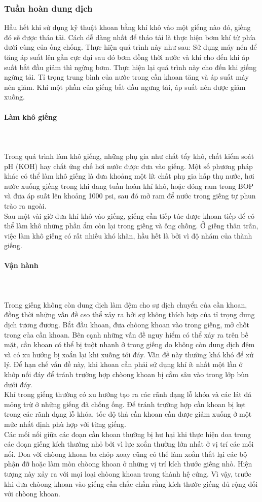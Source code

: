 \documentclass[12pt,a4paper]{article}
\newcommand{\subsubsubsection}[1]{\paragraph{#1}\mbox{}\\}
\begin{document}
\subsubsection{Tuần hoàn dung dịch}
	Hầu hết khi sử dụng kỹ thuật khoan bằng khí khô vào một giếng nào đó, giếng đó sẽ được tháo tải. Cách dễ dàng nhất để tháo tải là thực hiện bơm khí từ phía dưới cùng của ống chống. Thực hiện quá trình này như sau: Sử dụng máy nén để tăng áp suất lên gần cực đại sau đó bơm đồng thời nước và khí cho đến khi áp suất bắt đầu giảm thì ngừng bơm. Thực hiện lại quá trình này cho đến khi giếng ngừng tải. Tỉ trọng trung bình của nước trong cần khoan tăng và áp suất máy nén giảm. Khi một phần của giếng bắt đầu ngưng tải, áp suất nén được giảm xuống.
\subsubsubsection{Làm khô giếng}\\
	Trong quá trình làm khô giếng, những phụ gia như chất tẩy khô, chất kiểm soát pH (KOH) hay chất ứng chế hơi nước được đưa vào giếng. Một số phương pháp khác có thể làm khô giếng là đưa khoảng một lít chất phụ gia hấp thụ nước, hơi nước xuống giếng trong khi đang tuần hoàn khí khô, hoặc đóng ram trong BOP và đưa áp suất lên khoảng 1000 psi, sau đó mở ram để nước trong giếng tự phun trào ra ngoài.\\
	Sau một vài giờ đưa khí khô vào giếng, giếng cần tiếp túc được khoan tiếp để có thể làm khô những phần ẩm còn lại trong giếng và ống chống. Ở giếng thân trần, việc làm khô giếng có rất nhiều khó khăn, hầu hết là bởi vì độ nhám của thành giếng.
\subsubsubsection{Vận hành}\\
	Trong giếng không còn dung dịch làm đệm cho sự dịch chuyển của cần khoan, đồng thời những vấn đề cso thể xảy ra bởi sự không thích hợp của tỉ trọng dung dịch tương đương. Bắt đầu khoan, đưa chòong khoan vào trong giếng, mở chốt trong của cần khoan. Bên cạnh những vấn đề nguy hiểm có thể xảy ra trên bề mặt, cần khoan có thể bị tuột nhanh ở trong giếng do không còn dung dịch đệm và có xu hướng bị xoắn lại khi xuống tới đáy. Vấn đề này thường khá khó để xử lý. Để hạn chế vấn đề này, khi khoan cần phải sử dụng khí ít nhất một lần ở khớp nối đáy để tránh trường hợp chòong khoan bị cắm sâu vào trong lớp bùn dưới đáy.\\
	Khí trong giếng thường có xu hướng tạo ra các rãnh dạng lỗ khóa và các lát đá mỏng trừ ở những giếng đã chống ống. Để tránh trường hợp cần khoan bị kẹt trong các rãnh dạng lỗ khóa, tốc độ thả cần khoan cần được giảm xuống ở một mức nhất định phù hợp với từng giếng.\\
	Các mối nối giữa các đoạn cần khoan thường bị hư hại khi thực hiện doa trong các đoạn giếng kích thướng nhỏ bởi vì lực xoắn thường lớn nhất ở vị trí các mối nối. Doa với chòong khoan ba chóp xoay cũng có thể làm xoắn thắt lại các bộ phận đỡ hoặc làm mòn chòong khoan ở những vị trí kích thước giếng nhỏ. Hiện tượng này xảy ra với mọi loại chòong khoan trong thành hệ cứng. Vì vậy, trước khi đưa chòong khoan vào giếng cần chắc chắn rằng kích thước giếng đủ rộng đối với chòong khoan.
\end{document}
